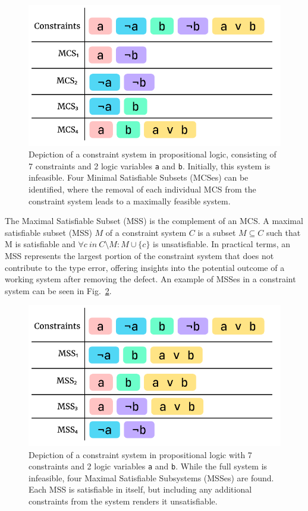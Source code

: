 \begin{figure}[hbt]
  \centering
  \includegraphics[width=0.8\linewidth]{MCS}
  \caption[An illustration of Minimal Satisfiable Subsets (MCSes)]{
    \label{fig:mcs-example}
    Depiction of a constraint system in propositional logic, consisting of 7 constraints and 2 logic variables \texttt{a} and \texttt{b}. Initially, this system is infeasible. Four Minimal Satisfiable Subsets (MCSes) can be identified, where the removal of each individual MCS from the constraint system leads to a maximally feasible system.}
\end{figure}

The Maximal Satisfiable Subset (MSS) is the complement of an MCS. A maximal satisfiable subset (MSS) $M$ of a constraint system $C$ is a subset $M \subseteq C$ such that M is satisfiable and $\forall{c}\ in\ C \setminus M:M\cup\{c\}$ is unsatisfiable. In practical terms, an MSS represents the largest portion of the constraint system that does not contribute to the type error, offering insights into the potential outcome of a working system after removing the defect. An example of MSSes in a constraint system can be seen in Fig.~\ref{fig:mss-example}.




\begin{figure}[hbt]
  \includegraphics[width=0.8\linewidth]{MSS}
  \caption[An illustration of Maximal Satisfiable Subsystems (MSSes)]{
    \label{fig:mss-example}
    Depiction of a constraint system in propositional logic with 7 constraints and 2 logic variables \texttt{a} and \texttt{b}. While the full system is infeasible, four Maximal Satisfiable Subsystems (MSSes) are found. Each MSS is satisfiable in itself, but including any additional constraints from the system renders it unsatisfiable. }
\end{figure}

